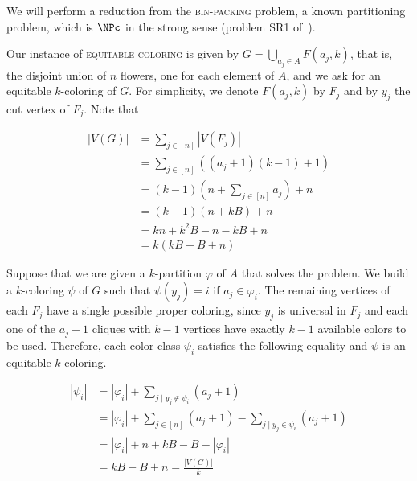\begin{tproof}
    We will perform a reduction from the \textsc{bin-packing} problem, a known partitioning problem, which is $\NPc$ in the strong sense (problem SR1 of~\citep{garey_johnson}).
    
    
    Our instance of \textsc{equitable coloring} is given by $G = \bigcup_{a_j \in A} F(a_j,k)$, that is, the disjoint union of $n$ flowers, one for each element of $A$, and we ask for an equitable $k$-coloring of $G$.
    For simplicity, we denote $F(a_j, k)$ by $F_j$ and by $y_j$ the cut vertex of $F_j$.
    Note that
    
    \begin{align*}
        |V(G)| &= \sum_{j \in [n]} |V(F_j)|\\
               &= \sum_{j \in [n]} \left((a_j + 1)(k-1) + 1\right)\\
               &= (k-1)\left(n + \sum_{j \in [n]} a_j\right) + n\\
               &= (k-1)(n + kB) + n\\
               &= kn + k^2B - n - kB + n\\
               &= k(kB - B + n)
    \end{align*}
    
    Suppose that we are given a $k$-partition $\varphi$ of $A$ that solves the problem.
    We build a $k$-coloring $\psi$ of $G$ such that $\psi(y_j) = i$ if $a_j \in \varphi_i$.
    The remaining vertices of each $F_j$ have a single possible proper coloring, since $y_j$ is universal in $F_j$ and each one of the $a_j + 1$ cliques with $k-1$ vertices have exactly $k-1$ available colors to be used. Therefore, each color class $\psi_i$ satisfies the following equality and $\psi$ is an equitable $k$-coloring.
    
    \begin{align*}
        |\psi_i| &= |\varphi_i| + \sum_{j \mid y_j \notin \psi_i} (a_j + 1)\\
                 &= |\varphi_i| + \sum_{j \in [n]} (a_j + 1) - \sum_{j \mid y_j \in \psi_i} (a_j + 1)\\
                 &= |\varphi_i| + n + kB - B - |\varphi_i|\\
                 &= kB - B + n = \frac{|V(G)|}{k}
    \end{align*}
    

\end{tproof}
